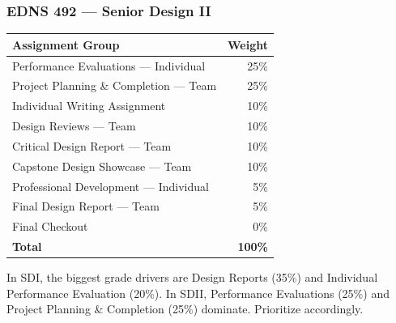 \subsubsection{EDNS 492 --- Senior Design II}

\begin{tabularx}{\textwidth}{Xr}
\toprule
\textbf{Assignment Group} & \textbf{Weight} \\
\midrule
Performance Evaluations --- Individual & 25\% \\
Project Planning \& Completion --- Team & 25\% \\
Individual Writing Assignment & 10\% \\
Design Reviews --- Team & 10\% \\
Critical Design Report --- Team & 10\% \\
Capstone Design Showcase --- Team & 10\% \\
Professional Development --- Individual & 5\% \\
Final Design Report --- Team & 5\% \\
Final Checkout & 0\% \\
\midrule
\textbf{Total} & \textbf{100\%} \\
\bottomrule
\end{tabularx}

\begin{protip}
In SDI, the biggest grade drivers are Design Reports (35\%) and Individual Performance Evaluation (20\%). In SDII, Performance Evaluations (25\%) and Project Planning \& Completion (25\%) dominate. Prioritize accordingly.
\end{protip}
